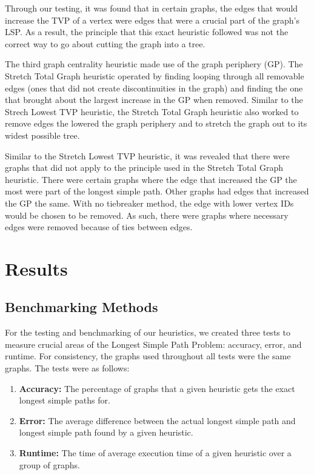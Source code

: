 \documentclass[twocolumn,showpacs,%
  nofootinbib,aps,superscriptaddress,%
  eqsecnum,prd,notitlepage,showkeys,11pt]{article}
\begin{document}
Through our testing, it was found that in certain graphs, the edges that would increase the TVP of a vertex were edges that were a crucial part of the graph's LSP. As a result, the principle that this exact heuristic followed was not the correct way to go about cutting the graph into a tree.

The third graph centrality heuristic made use of the graph periphery (GP). The Stretch Total Graph heuristic operated by finding looping through all removable edges (ones that did not create discontinuities in the graph) and finding the one that brought about the largest increase in the GP when removed. Similar to the Strech Lowest TVP heuristic, the Stretch Total Graph heuristic also worked to remove edges the lowered the graph periphery and to stretch the graph out to its widest possible tree. 

Similar to the Stretch Lowest TVP heuristic, it was revealed that there were graphs that did not apply to the principle used in the Stretch Total Graph heuristic. There were certain graphs where the edge that increased the GP the most were part of the longest simple path. Other graphs had edges that increased the GP the same. With no tiebreaker method, the edge with lower vertex IDs would be chosen to be removed. As such, there were graphs where necessary edges were removed because of ties between edges.

\section{\centering Results}
\subsection{Benchmarking Methods}
For the testing and benchmarking of our heuristics, we created three tests to measure crucial areas of the Longest Simple Path Problem: accuracy, error, and runtime. For consistency, the graphs used throughout all tests were the same graphs. The tests were as follows:

\begin{enumerate}
    \item \textbf{Accuracy:} The percentage of graphs that a given heuristic gets the exact longest simple paths for.
    \item \textbf{Error:} The average difference between the actual longest simple path and longest simple path found by a given heuristic.
    \item \textbf{Runtime:} The time of average execution time of a given heuristic over a group of graphs.
\end{enumerate}
\end{document}
